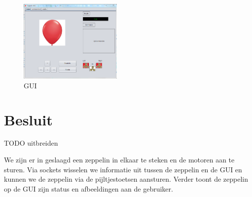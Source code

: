 \documentclass[eind]{penoverslag}
\begin{document}
\begin{figure}[ht!]
\centering
\includegraphics[height=40mm]{GUI.png}
\caption{GUI}
\label{GUI}
\end{figure}


\section{Besluit}
TODO uitbreiden

We zijn er in geslaagd een zeppelin in elkaar te steken en de motoren aan te sturen. Via sockets wisselen we informatie uit tussen de zeppelin en de GUI en kunnen we de zeppelin via de pijltjestoetsen aansturen. Verder toont de zeppelin op de GUI zijn status en afbeeldingen aan de gebruiker. \\




\newpage\makeappendix
\end{document}
